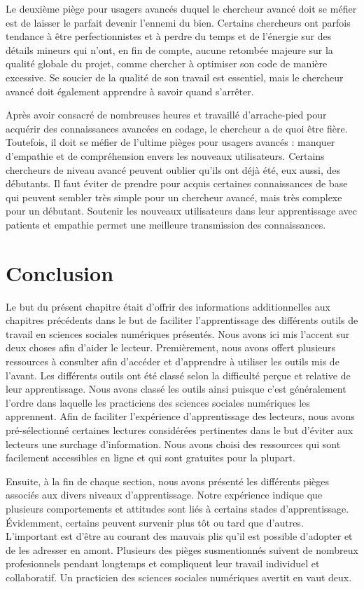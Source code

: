 \documentclass[
  letterpaper,
  DIV=11,
  numbers=noendperiod]{scrreprt}
\begin{document}
Le deuxième piège pour usagers avancés duquel le chercheur avancé doit
se méfier est de laisser le parfait devenir l'ennemi du bien. Certains
chercheurs ont parfois tendance à être perfectionnistes et à perdre du
temps et de l'énergie sur des détails mineurs qui n'ont, en fin de
compte, aucune retombée majeure sur la qualité globale du projet, comme
chercher à optimiser son code de manière excessive. Se soucier de la
qualité de son travail est essentiel, mais le chercheur avancé doit
également apprendre à savoir quand s'arrêter.

Après avoir consacré de nombreuses heures et travaillé d'arrache-pied
pour acquérir des connaissances avancées en codage, le chercheur a de
quoi être fière. Toutefois, il doit se méfier de l'ultime pièges pour
usagers avancés : manquer d'empathie et de compréhension envers les
nouveaux utilisateurs. Certains chercheurs de niveau avancé peuvent
oublier qu'ils ont déjà été, eux aussi, des débutants. Il faut éviter de
prendre pour acquis certaines connaissances de base qui peuvent sembler
très simple pour un chercheur avancé, mais très complexe pour un
débutant. Soutenir les nouveaux utilisateurs dans leur apprentissage
avec patients et empathie permet une meilleure transmission des
connaissances.

\section{Conclusion}\label{conclusion-7}

Le but du présent chapitre était d'offrir des informations
additionnelles aux chapitres précédents dans le but de faciliter
l'apprentissage des différents outils de travail en sciences sociales
numériques présentés. Nous avons ici mis l'accent sur deux choses afin
d'aider le lecteur. Premièrement, nous avons offert plusieurs ressources
à consulter afin d'accéder et d'apprendre à utiliser les outils mis de
l'avant. Les différents outils ont été classé selon la difficulté perçue
et relative de leur apprentissage. Nous avons classé les outils ainsi
puisque c'est généralement l'ordre dans laquelle les practiciens des
sciences sociales numériques les apprennent. Afin de faciliter
l'expérience d'apprentissage des lecteurs, nous avons pré-sélectionné
certaines lectures considérées pertinentes dans le but d'éviter aux
lecteurs une surchage d'information. Nous avons choisi des ressources
qui sont facilement accessibles en ligne et qui sont gratuites pour la
plupart.

Ensuite, à la fin de chaque section, nous avons présenté les différents
pièges associés aux divers niveaux d'apprentissage. Notre expérience
indique que plusieurs comportements et attitudes sont liés à certains
stades d'apprentissage. Évidemment, certains peuvent survenir plus tôt
ou tard que d'autres. L'important est d'être au courant des mauvais plis
qu'il est possible d'adopter et de les adresser en amont. Plusieurs des
pièges susmentionnés suivent de nombreux profesionnels pendant longtemps
et compliquent leur travail individuel et collaboratif. Un practicien
des sciences sociales numériques avertit en vaut deux.
\end{document}
